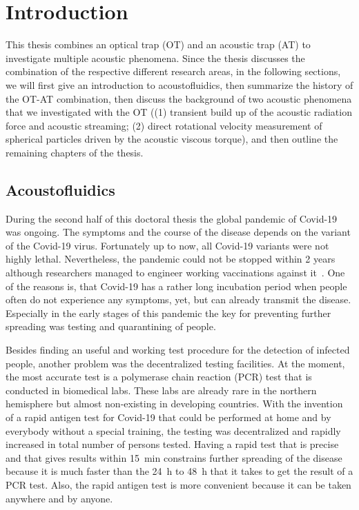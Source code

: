 \chapter{Introduction\label{ch:intro}}

This thesis combines an optical trap (OT) and an acoustic trap (AT) to 
investigate multiple acoustic phenomena. Since the thesis discusses the 
combination of the respective different research areas, in the following 
sections, we will first give an introduction to acoustofluidics, then summarize 
the history of the OT-AT combination, then discuss the background of two 
acoustic phenomena that we investigated with the OT ((1) transient build up of 
the acoustic radiation force and acoustic streaming; (2) direct rotational 
velocity measurement of spherical particles driven by the acoustic viscous 
torque), and then outline the remaining chapters of the thesis.

\section{Acoustofluidics}

During the second half of this doctoral thesis the global pandemic of Covid-19 
was ongoing. The symptoms and the course of the disease depends on the variant 
of the Covid-19 virus. Fortunately up to now, all Covid-19 variants were not 
highly lethal. Nevertheless, the pandemic could not be stopped within 2 years 
although researchers managed to engineer working vaccinations against 
it~\cite{Polack2020,Mahase2020,Voysey2021}. One of the reasons is, that 
Covid-19 has a rather long incubation period when people often do not 
experience any symptoms, yet, but can already transmit the disease. Especially 
in the early stages of this pandemic the key for preventing further spreading 
was testing and quarantining of people.

Besides finding an useful and working test procedure for the detection of 
infected people, another problem was the decentralized testing facilities. At 
the moment, the most accurate test is a polymerase chain reaction (PCR) test 
that is conducted in biomedical labs. These labs are already rare in the 
northern hemisphere but almost non-existing in developing countries. With the 
invention of a rapid antigen test for Covid-19 that could be performed at home 
and by everybody without a special training, the testing was decentralized and 
rapidly increased in total number of persons tested. Having a rapid test that 
is precise~\cite{Albert2021} and that gives results within \SI{15}{\minute} 
constrains further spreading of the disease because it is much faster than the 
\SI{24}{\hour} to \SI{48}{\hour} that it takes to get the result of a PCR test. 
Also, the rapid antigen test is more convenient because it can be taken 
anywhere and by anyone.

